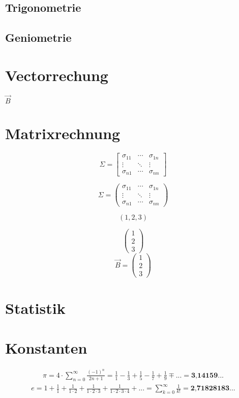 \documentclass[12pt,a4paper,fleqn,twoside,pdf,final]{article}
\begin{document}
\subsection{Trigonometrie}
\subsection{Geniometrie}
\section{Vectorrechung}
$\vec{B}$
\section{Matrixrechnung}

 
 $$
\Sigma=\left[
\begin{array}{ccc}
   \sigma_{11} & \cdots & \sigma_{1n} \\
   \vdots & \ddots & \vdots \\
   \sigma_{n1} & \cdots & \sigma_{nn}
\end{array}
\right]
$$

 $$
\Sigma=\left(
\begin{array}{ccc}
   \sigma_{11} & \cdots & \sigma_{1n} \\
   \vdots & \ddots & \vdots \\
   \sigma_{n1} & \cdots & \sigma_{nn}
\end{array}
\right)
$$


\newcommand*{\rowvec}[1]{\left( #1\right)}
\newcommand*{\rowvecVert}[1]{\left(\begin{array}{c}#1\end{array}\right)}

$$
\rowvec{1,2,3}
$$

$$
\left( 
\begin{array}{c}
1 \\ 2 \\ 3
\end{array}
\right)
$$
$$
\vec{B} = \rowvecVert{1 \\ 2 \\ 3}
$$

\section{Statistik}

\section{Konstanten}
\begin{align*} 
\pi =  4 \cdot \sum_{n=0}^\infty  \frac{(-1)^n}{2n+1} = \frac{1}{1} -  \frac{1}{3} +  \frac{1}{5} -  \frac{1}{7} + \frac{1}{9} \mp ... = \textbf{3,14159}...
\end{align*}
\begin{align*} 
e = 1 + \frac{1}{1}+\frac{1}{1 \cdot 2}+\frac{1}{1 \cdot 2  \cdot 3}+\frac{1}{1 \cdot 2  \cdot 3  \cdot 4}+... = \sum_{k=0}^\infty \frac{1}{k!} = \textbf{2,71828183}...
\end{align*}
\end{document}
